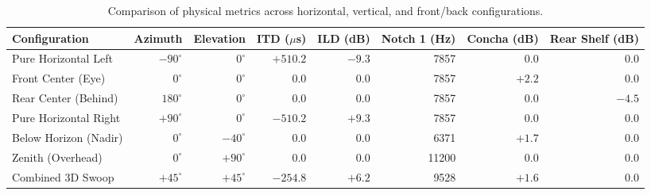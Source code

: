 \documentclass[11pt,a4paper]{article}
\begin{document}
\begin{table}[h]
\centering
\small
\begin{tabular}{@{}lrrrrrrr@{}}
\toprule
\textbf{Configuration} & \textbf{Azimuth} & \textbf{Elevation} & \textbf{ITD ($\mu$s)} & \textbf{ILD (dB)} & \textbf{Notch 1 (Hz)} & \textbf{Concha (dB)} & \textbf{Rear Shelf (dB)} \\
\midrule
Pure Horizontal Left   & $-90^\circ$ & $0^\circ$  & $+510.2$ & $-9.3$ & 7857 & $0.0$ & $0.0$ \\
Front Center (Eye)     & $0^\circ$   & $0^\circ$  & $0.0$    & $0.0$  & 7857 & $+2.2$ & $0.0$ \\
Rear Center (Behind)   & $180^\circ$ & $0^\circ$  & $0.0$    & $0.0$  & 7857 & $0.0$ & $-4.5$ \\
Pure Horizontal Right  & $+90^\circ$ & $0^\circ$  & $-510.2$ & $+9.3$ & 7857 & $0.0$ & $0.0$ \\
\midrule
Below Horizon (Nadir)  & $0^\circ$   & $-40^\circ$ & $0.0$   & $0.0$  & 6371 & $+1.7$ & $0.0$ \\
Zenith (Overhead)      & $0^\circ$   & $+90^\circ$ & $0.0$   & $0.0$  & 11200 & $0.0$ & $0.0$ \\
\midrule
Combined 3D Swoop      & $+45^\circ$ & $+45^\circ$ & $-254.8$ & $+6.2$ & 9528 & $+1.6$ & $0.0$ \\
\bottomrule
\end{tabular}
\caption{Comparison of physical metrics across horizontal, vertical, and front/back configurations.}
\label{tab:metrics}
\end{table}
\end{document}
